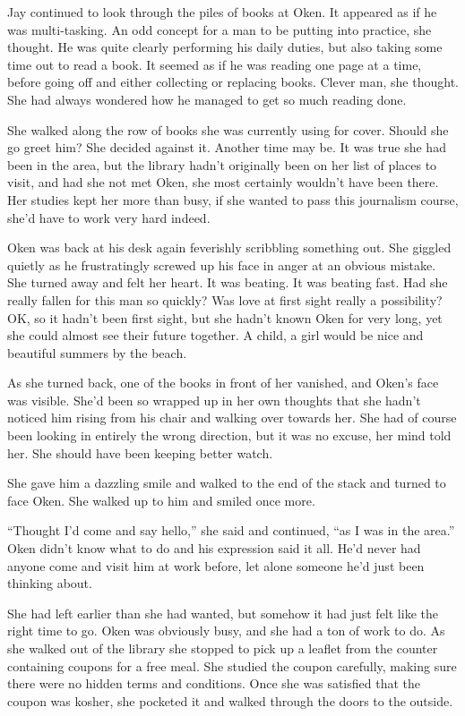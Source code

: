 Jay continued to look through the piles of books at Oken.  It appeared as if he was multi-tasking.  An odd concept for a man to be putting into practice, she thought.  He was quite clearly performing his daily duties, but also taking some time out to read a book.  It seemed as if he was reading one page at a time, before going off and either collecting or replacing books.  Clever man, she thought.  She had always wondered how he managed to get so much reading done.  

She walked along the row of books she was currently using for cover.  Should she go greet him?  She decided against it.  Another time may be.  It was true she had been in the area, but the library hadn't originally been on her list of places to visit, and had she not met Oken, she most certainly wouldn't have been there.  Her studies kept her more than busy, if she wanted to pass this journalism course, she'd have to work very hard indeed.

Oken was back at his desk again feverishly scribbling something out.  She giggled quietly as he frustratingly screwed up his face in anger at an obvious mistake.  She turned away and felt her heart.  It was beating.  It was beating fast.  Had she really fallen for this man so quickly?  Was love at first sight really a possibility?  OK, so it hadn't been first sight, but she hadn't known Oken for very long, yet she could almost see their future together.  A child, a girl would be nice and beautiful summers by the beach.

As she turned back, one of the books in front of her vanished, and Oken's face was visible.  She'd been so wrapped up in her own thoughts that she hadn't noticed him rising from his chair and walking over towards her.  She had of course been looking in entirely the wrong direction, but it was no excuse, her mind told her.  She should have been keeping better watch.

She gave him a dazzling smile and walked to the end of the stack and turned to face Oken.  She walked up to him and smiled once more.

``Thought I'd come and say hello,'' she said and continued, ``as I was in the area.''  Oken didn't know what to do and his expression said it all.  He'd never had anyone come and visit him at work before,  let alone someone he'd just been thinking about.



\thoughtbreak



She had left earlier than she had wanted, but somehow it had just felt like the right time to go.  Oken was obviously busy, and she had a ton of work to do.  As she walked out of the library she stopped to pick up a leaflet from the counter containing coupons for a free meal.  She studied the coupon carefully, making sure there were no hidden terms and conditions.  Once she was satisfied that the coupon was kosher, she pocketed it and walked through the doors to the outside.

